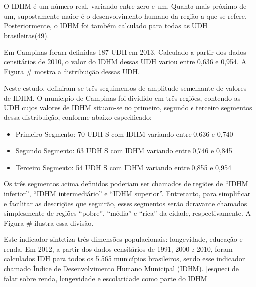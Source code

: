 O IDHM é um número real, variando entre zero e um. Quanto mais próximo de um, supostamente maior é o desenvolvimento humano da região a que se refere. Posteriormente, o IDHM foi também calculado para todas as UDH brasileiras(49).

Em Campinas foram definidas 187 UDH em 2013. Calculado a partir dos dados censitários de 2010, o valor do IDHM dessas UDH variou entre 0,636 e 0,954. A Figura \# mostra a distribuição dessas UDH.

Neste estudo, definiram-se três seguimentos de amplitude semelhante de valores de IDHM. O município de Campinas foi dividido em três regiões, contendo as UDH cujos valores de IDHM situam-se no primeiro, segundo e terceiro segmentos dessa distribuição, conforme abaixo especificado:

\begin{itemize}
    \item Primeiro Segmento: 70 UDH S com IDHM variando entre 0,636 e 0,740
    \item Segundo Segmento: 63 UDH S com IDHM variando entre 0,746 e 0,845
    \item Terceiro Segmento: 54 UDH S com IDHM variando entre 0,855 e 0,954
\end{itemize}

Os três segmentos acima definidos poderiam ser chamados de regiões de “IDHM inferior”, “IDHM intermediário” e “IDHM superior”. Entretanto, para simplificar e facilitar as descrições que seguirão, esses segmentos serão doravante chamados simplesmente de regiões “pobre”, “média” e “rica” da cidade, respectivamente. A Figura \# ilustra essa divisão.

Este indicador sintetiza três dimensões populacionais: longevidade, educação e renda. Em 2012, a partir dos dados censitários de 1991, 2000 e 2010, foram calculados IDH para todos os 5.565 municípios brasileiros, sendo esse indicador chamado Índice de Desenvolvimento Humano Municipal (IDHM). [esqueci de falar sobre renda, longevidade e escolaridade como parte do IDHM]
